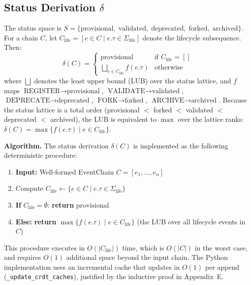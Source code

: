 \subsection{Status Derivation $\delta$}

The status space is $S = \{\text{provisional},\; \text{validated},\; \text{deprecated},\; \text{forked},\; \text{archived}\}$. For a chain $C$, let $C_{\text{life}} = [e \in C \mid e.\tau \in \Sigma_{\text{life}}]$ denote the lifecycle subsequence. Then:
\begin{equation}
    \delta(C) = \begin{cases}
        \text{provisional} & \text{if } C_{\text{life}} = [] \\
        \bigsqcup_{e \in C_{\text{life}}} f(e.\tau) & \text{otherwise}
    \end{cases}
\end{equation}
where $\bigsqcup$ denotes the least upper bound (LUB) over the status lattice, and $f$ maps $\text{REGISTER} \to \text{provisional}$, $\text{VALIDATE} \to \text{validated}$, $\text{DEPRECATE} \to \text{deprecated}$, $\text{FORK} \to \text{forked}$, $\text{ARCHIVE} \to \text{archived}$. Because the status lattice is a total order (provisional $<$ forked $<$ validated $<$ deprecated $<$ archived), the LUB is equivalent to $\max$ over the lattice ranks: $\delta(C) = \max\{f(e.\tau) \mid e \in C_{\text{life}}\}$.

\textbf{Algorithm.} The status derivation $\delta(C)$ is implemented as the following deterministic procedure:
\begin{enumerate}[label=\arabic*.]
    \item \textbf{Input:} Well-formed EventChain $C = [e_1, \ldots, e_n]$
    \item Compute $C_{\text{life}} \gets \{e \in C \mid e.\tau \in \Sigma_{\text{life}}\}$
    \item \textbf{If} $C_{\text{life}} = \emptyset$: \textbf{return} $\text{provisional}$
    \item \textbf{Else:} \textbf{return} $\max\{f(e.\tau) \mid e \in C_{\text{life}}\}$ (the LUB over all lifecycle events in $C$)
\end{enumerate}
This procedure executes in $O(|C_{\text{life}}|)$ time, which is $O(|C|)$ in the worst case, and requires $O(1)$ additional space beyond the input chain. The Python implementation uses an incremental cache that updates in $O(1)$ per append (\texttt{\_update\_crdt\_caches}), justified by the inductive proof in Appendix~E.

